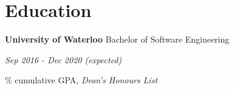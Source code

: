 \documentclass[paper=a4,fontsize=15pt]{scrartcl}
\newcommand{\quarterspace}{\vspace*{0.25em}}
\begin{document}
\section*{Education}{}
\noindent \textbf{University of Waterloo} Bachelor of Software Engineering \par
\quarterspace
\footnotesize
\noindent \textit{Sep 2016 - Dec 2020 (expected)} \par
{}\% cumulative GPA, \textit{Dean's Honours List}
\end{document}
